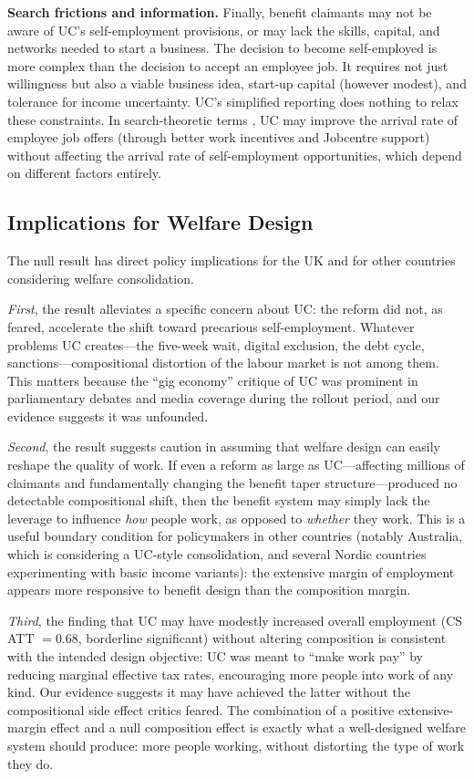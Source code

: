 \documentclass[12pt]{article}
\begin{document}
\textbf{Search frictions and information.} Finally, benefit claimants may not be aware of UC's self-employment provisions, or may lack the skills, capital, and networks needed to start a business. The decision to become self-employed is more complex than the decision to accept an employee job. It requires not just willingness but also a viable business idea, start-up capital (however modest), and tolerance for income uncertainty. UC's simplified reporting does nothing to relax these constraints. In search-theoretic terms \citep{acemogluProductivityGainsJob2001}, UC may improve the arrival rate of employee job offers (through better work incentives and Jobcentre support) without affecting the arrival rate of self-employment opportunities, which depend on different factors entirely.

\subsection{Implications for Welfare Design}

The null result has direct policy implications for the UK and for other countries considering welfare consolidation.

\textit{First}, the result alleviates a specific concern about UC: the reform did not, as feared, accelerate the shift toward precarious self-employment. Whatever problems UC creates---the five-week wait, digital exclusion, the debt cycle, sanctions---compositional distortion of the labour market is not among them. This matters because the ``gig economy'' critique of UC was prominent in parliamentary debates and media coverage during the rollout period, and our evidence suggests it was unfounded.

\textit{Second}, the result suggests caution in assuming that welfare design can easily reshape the quality of work. If even a reform as large as UC---affecting millions of claimants and fundamentally changing the benefit taper structure---produced no detectable compositional shift, then the benefit system may simply lack the leverage to influence \textit{how} people work, as opposed to \textit{whether} they work. This is a useful boundary condition for policymakers in other countries (notably Australia, which is considering a UC-style consolidation, and several Nordic countries experimenting with basic income variants): the extensive margin of employment appears more responsive to benefit design than the composition margin.

\textit{Third}, the finding that UC may have modestly increased overall employment (CS ATT $= 0.68$, borderline significant) without altering composition is consistent with the intended design objective: UC was meant to ``make work pay'' by reducing marginal effective tax rates, encouraging more people into work of any kind. Our evidence suggests it may have achieved the latter without the compositional side effect critics feared. The combination of a positive extensive-margin effect and a null composition effect is exactly what a well-designed welfare system should produce: more people working, without distorting the type of work they do.
\end{document}
